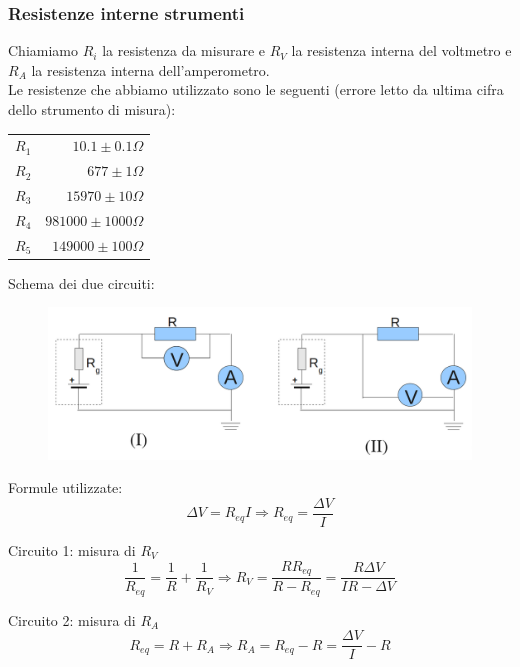 
\subsubsection{Resistenze interne strumenti}
%    
    Chiamiamo $R_i$ la resistenza da misurare e $R_V$ la resistenza interna del voltmetro e $R_A$ la resistenza interna dell'amperometro.\\    
%  
    Le resistenze che abbiamo utilizzato sono le seguenti (errore letto da ultima cifra dello strumento di misura):
    \begin{table}[H]
        \centering
        \begin{tabular}{|l r|}
            \hline
            $R_1$ & $ 10.1 \pm 0.1\Omega$      \\
            $R_2$ & $ 677 \pm 1\Omega$         \\
            $R_3$ & $ 15970 \pm 10\Omega$      \\
            $R_4$ & $ 981000 \pm 1000\Omega$   \\ 
            $R_5$ & $ 149000 \pm 100\Omega$    \\ 
            \hline
        \end{tabular}
    \end{table}
    
    Schema dei due circuiti:
    \begin{figure}[H]
    \centering
    \includegraphics[scale=.25]{Grafici/C1_P1.png}
    \end{figure} 
    
    
    Formule utilizzate:
    $$ \Delta V = R_{eq} I \Rightarrow R_{eq}=\frac{\Delta V}{I}$$

    Circuito 1: misura di $R_V$
    $$ \frac{1}{R_{eq}} = \frac{1}{R} + \frac{1}{R_V} \Rightarrow R_V = \frac{RR_{eq}}{R-R_{eq}} = \frac{R \Delta V}{IR - \Delta V} $$
    
    
    Circuito 2: misura di $R_A$
    $$ R_{eq} = R + R_A \Rightarrow R_A = R_{eq} - R = \frac{\Delta V}{I} - R$$
    
